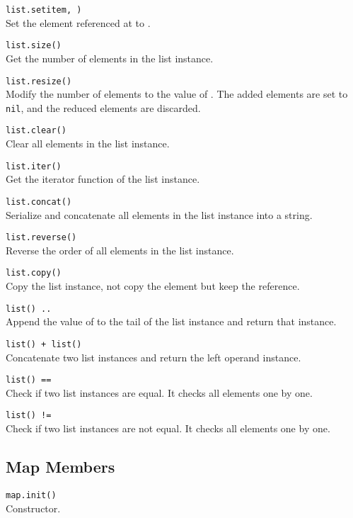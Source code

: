 \hangpar \texttt{list.setitem}\texttt{, }\texttt{)}\\
Set the element referenced at  to .

\hangpar \texttt{list.size()}\\
Get the number of elements in the list instance.

\hangpar \texttt{list.resize(}\texttt{)}\\
Modify the number of elements to the value of . The added elements are set to \texttt{nil}, and the reduced elements are discarded.

\hangpar \texttt{list.clear()}\\
Clear all elements in the list instance.

\hangpar \texttt{list.iter()}\\
Get the iterator function of the list instance.

\hangpar \texttt{list.concat()}\\
Serialize and concatenate all elements in the list instance into a string.

\hangpar \texttt{list.reverse()}\\
Reverse the order of all elements in the list instance.

\hangpar \texttt{list.copy()}\\
Copy the list instance, not copy the element but keep the reference.

\hangpar \texttt{list() .. }\\
Append the value of  to the tail of the list instance and return that instance.

\hangpar \texttt{list() + }\texttt{list()}\\
Concatenate two list instances and return the left operand instance.

\hangpar \texttt{list() == }\\
Check if two list instances are equal. It checks all elements one by one.

\hangpar \texttt{list() != }\\
Check if two list instances are not equal. It checks all elements one by one.

\subsection*{Map Members}

\hangpar \texttt{map.init()}\\
Constructor.

